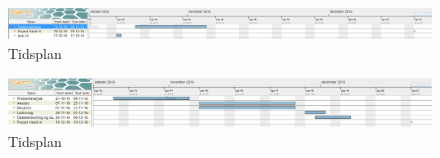 \begin{figure} [H]
\includegraphics[scale=0.35]{Tidsplan1}
\caption{Tidsplan}
\end{figure}

\begin{figure} [H]
\includegraphics[scale=0.35]{Tidsplan2}
\caption{Tidsplan}
\end{figure}

